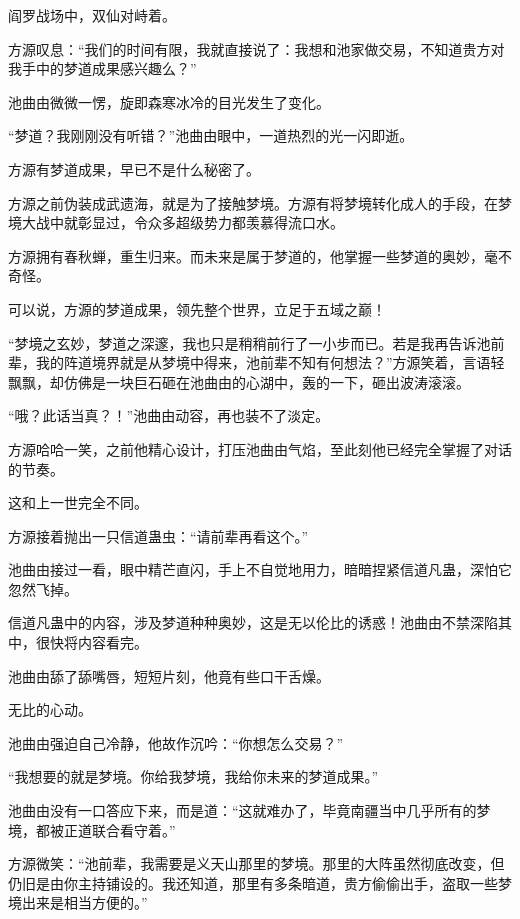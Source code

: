 
\begin{this_body}

阎罗战场中，双仙对峙着。

方源叹息：“我们的时间有限，我就直接说了：我想和池家做交易，不知道贵方对我手中的梦道成果感兴趣么？”

池曲由微微一愣，旋即森寒冰冷的目光发生了变化。

“梦道？我刚刚没有听错？”池曲由眼中，一道热烈的光一闪即逝。

方源有梦道成果，早已不是什么秘密了。

方源之前伪装成武遗海，就是为了接触梦境。方源有将梦境转化成人的手段，在梦境大战中就彰显过，令众多超级势力都羡慕得流口水。

方源拥有春秋蝉，重生归来。而未来是属于梦道的，他掌握一些梦道的奥妙，毫不奇怪。

可以说，方源的梦道成果，领先整个世界，立足于五域之巅！

“梦境之玄妙，梦道之深邃，我也只是稍稍前行了一小步而已。若是我再告诉池前辈，我的阵道境界就是从梦境中得来，池前辈不知有何想法？”方源笑着，言语轻飘飘，却仿佛是一块巨石砸在池曲由的心湖中，轰的一下，砸出波涛滚滚。

“哦？此话当真？！”池曲由动容，再也装不了淡定。

方源哈哈一笑，之前他精心设计，打压池曲由气焰，至此刻他已经完全掌握了对话的节奏。

这和上一世完全不同。

方源接着抛出一只信道蛊虫：“请前辈再看这个。”

池曲由接过一看，眼中精芒直闪，手上不自觉地用力，暗暗捏紧信道凡蛊，深怕它忽然飞掉。

信道凡蛊中的内容，涉及梦道种种奥妙，这是无以伦比的诱惑！池曲由不禁深陷其中，很快将内容看完。

池曲由舔了舔嘴唇，短短片刻，他竟有些口干舌燥。

无比的心动。

池曲由强迫自己冷静，他故作沉吟：“你想怎么交易？”

“我想要的就是梦境。你给我梦境，我给你未来的梦道成果。”

池曲由没有一口答应下来，而是道：“这就难办了，毕竟南疆当中几乎所有的梦境，都被正道联合看守着。”

方源微笑：“池前辈，我需要是义天山那里的梦境。那里的大阵虽然彻底改变，但仍旧是由你主持铺设的。我还知道，那里有多条暗道，贵方偷偷出手，盗取一些梦境出来是相当方便的。”


\end{this_body}
